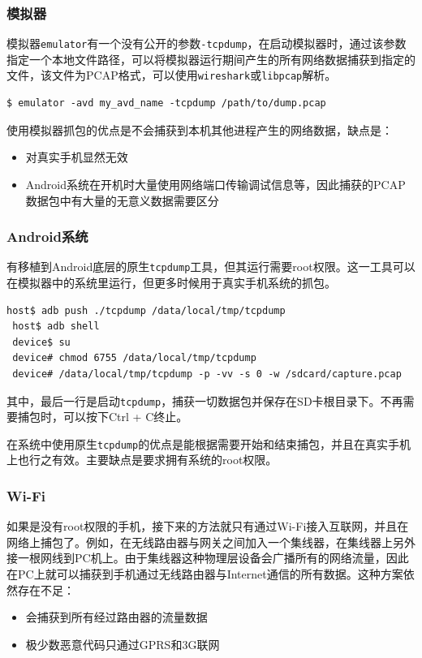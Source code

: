 \subsubsection{模拟器}
模拟器\lstinline!emulator!有一个没有公开的参数\lstinline!-tcpdump!，在启动模拟器时，通过该参数指定一个本地文件路径，可以将模拟器运行期间产生的所有网络数据捕获到指定的文件，该文件为PCAP格式，可以使用\lstinline!wireshark!或\lstinline!libpcap!解析。
\begin{lstlisting}[numbers=none]
 $ emulator -avd my_avd_name -tcpdump /path/to/dump.pcap
\end{lstlisting}
使用模拟器抓包的优点是不会捕获到本机其他进程产生的网络数据，缺点是：
\begin{itemize}
  \item 对真实手机显然无效
  \item Android系统在开机时大量使用网络端口传输调试信息等，因此捕获的PCAP数据包中有大量的无意义数据需要区分
\end{itemize}

\subsubsection{Android系统}
有移植到Android底层的原生\lstinline!tcpdump!工具，但其运行需要root权限。这一工具可以在模拟器中的系统里运行，但更多时候用于真实手机系统的抓包。
\begin{lstlisting}[numbers=none]
 host$ adb push ./tcpdump /data/local/tmp/tcpdump
 host$ adb shell
 device$ su
 device# chmod 6755 /data/local/tmp/tcpdump
 device# /data/local/tmp/tcpdump -p -vv -s 0 -w /sdcard/capture.pcap
\end{lstlisting}
其中，最后一行是启动\lstinline!tcpdump!，捕获一切数据包并保存在SD卡根目录下。不再需要捕包时，可以按下Ctrl + C终止。

在系统中使用原生\lstinline!tcpdump!的优点是能根据需要开始和结束捕包，并且在真实手机上也行之有效。主要缺点是要求拥有系统的root权限。

\subsubsection{Wi-Fi}
如果是没有root权限的手机，接下来的方法就只有通过Wi-Fi接入互联网，并且在网络上捕包了。例如，在无线路由器与网关之间加入一个集线器，在集线器上另外接一根网线到PC机上。由于集线器这种物理层设备会广播所有的网络流量，因此在PC上就可以捕获到手机通过无线路由器与Internet通信的所有数据。这种方案依然存在不足：
\begin{itemize}
  \item 会捕获到所有经过路由器的流量数据
  \item 极少数恶意代码只通过GPRS和3G联网
\end{itemize}

